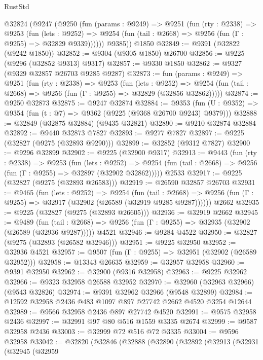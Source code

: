 \begin{lexlean}{RustStd}
\begin{coremodule}
    @32824
      (@9247
        (@9250
          (fun (params : @9249) =>
          @9251
            (fun (rty : @2338) =>
            @9253
              (fun (lets : @9252) =>
              @9254 (fun (tail : @2668) => @9256 (fun (Γ : @9255) => @32829 @9339))))))
        @9385))
    @1850
@32849 := @9391 (@32822 (@9242 @1850))
@32852 := @9304 (@9305 @1850) @26700
@32856 := @9225 (@9296 (@32852 @9313) @9317)
@32857 := @9330 @1850
@32862 := @9327 (@9329 @32857 @26703 @9285 @9287)
@32873 := fun (params : @9249) =>
  @9251
    (fun (rty : @2338) =>
    @9253
      (fun (lets : @9252) =>
      @9254 (fun (tail : @2668) => @9256 (fun (Γ : @9255) => @32829 (@32856 @32862)))))
@32874 := @9250 @32873
@32875 := @9247 @32874
@32884 := @9353
    (fun (U : @9352) => @9354 (fun (t : @7) => @9362 (@9225 (@9368 @26700 @9243) @9379)))
@32888 := @32849 (@32875 @32884) (@9435 @32821)
@32890 := @9210 @32874 @32884
@32892 := @9440 @32873 @7827
@32893 := @9277 @7827
@32897 := @9225 (@32827 (@9275 (@32893 @9290)))
@32899 := @32852 (@9312 @7827)
@32900 := @9296 @32899
@32902 := @9225 (@32900 @9317)
@32913 := @9443
    (fun (rty : @2338) =>
    @9253
      (fun (lets : @9252) =>
      @9254 (fun (tail : @2668) => @9256 (fun (Γ : @9255) => @32897 (@32902 @32862)))))
    @2533
@32917 := @9225 (@32827 (@9275 (@32893 @26583)))
@32919 := @26590 @32857 @26703
@32931 := @9465
    (fun (lets : @9252) =>
    @9254
      (fun (tail : @2668) =>
      @9256 (fun (Γ : @9255) => @32917 (@32902 (@26589 (@32919 @9285 @9287))))))
    @2662
@32935 := @9225 (@32827 (@9275 (@32893 @26605)))
@32936 := @32919 @2662
@32945 := @9489
    (fun (tail : @2668) => @9256 (fun (Γ : @9255) => @32935 (@32902 (@26589 (@32936 @9287)))))
    @4521
@32946 := @9284 @4522
@32950 := @32827 (@9275 (@32893 (@26582 @32946)))
@32951 := @9225 @32950
@32952 := @32936 @4521
@32957 := @9507 (fun (Γ : @9255) => @32951 (@32902 (@26589 @32952)))
@32958 := @13343 @26635
@32959 := @32957 @32958
@32960 := @9391 @32950
@32962 := @32900 (@9316 @32958)
@32963 := @9225 @32962
@32966 := @9323 @32958 @26588 @32952
@32970 := @32960 (@32963 @32966) (@9543 @32826)
@32974 := @9391 @32962 @32966 (@9548 @32899)
@32984 := @12592 @32958 @2436 @483 @1097 @897 @27742 @2662 @4520 @3254 @12644
@32989 := @9566 @32958 @2436 @897 @27742 @4520
@32991 := @9575 @32958 @2436
@32997 := @32991 @97 @80 @516 @1559 @3335 @2674
@32999 := @9587 @32958 @2436
@33003 := @32999 @72 @516 @72 @3335
@33004 := @9596 @32958
@33042 := @32820
    (@32846
      (@32888
        (@32890
          (@32892
            (@32913
              (@32931
                (@32945
                  (@32959

\end{coremodule}
\end{lexlean}
